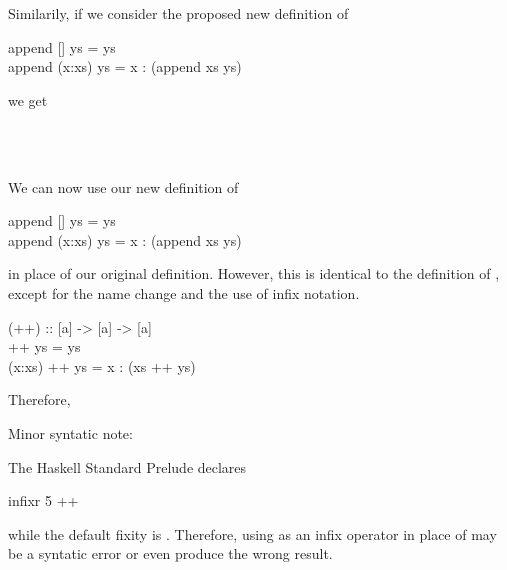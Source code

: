 \documentclass{seminar}
\begin{document}
\begin{slide}
\newslide

Similarily, if we consider the proposed new definition of 

\begin{code}
append [] ys = ys\\
append (x:xs) ys = x : (append xs ys)
\end{code}

we get

\begin{codenott}
\\
\\
\bottom
\end{codenott}

\newslide

We can now use our new definition of 

\begin{code}
append [] ys = ys\\
append (x:xs) ys = x : (append xs ys)
\end{code}

in place of our
original definition.
However, this is identical to the definition of \textcd{++}, except for
the name change and the use of infix notation.

\begin{code}
(++) :: [a] -> [a] -> [a]\\
[]     ++ ys = ys\\
(x:xs) ++ ys = x : (xs ++ ys)
\end{code}

Therefore,

\begin{codenott}
\end{codenott}

\newslide

Minor syntatic note:

The Haskell Standard Prelude declares

\begin{code}
infixr 5 ++
\end{code}

while the default fixity is .  Therefore, using
 as an infix operator in place of \textcd{++} may
be a syntatic error or even produce the wrong result.

\newslide

\ack

\end{slide}
\end{document}
